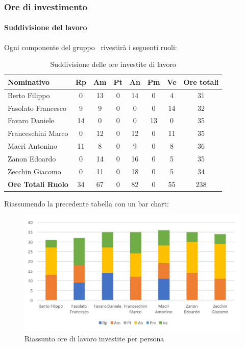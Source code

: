 \documentclass[../PianoDiProgetto.tex]{subfiles}
\begin{document}
		\newpage
		\subsubsection{Ore di investimento}
			\paragraph{Suddivisione del lavoro}
			Ogni componente del gruppo \kpanic\ rivestirà i seguenti ruoli:
			\begin{table}[h]
				\begin{tabularx}{\textwidth}{l * {6}{C} c}
				\toprule
				\textbf{Nominativo} & \textbf{Rp} & \textbf{Am} & \textbf{Pt} & \textbf{An} & \textbf{Pm} & \textbf{Ve} & \textbf{Ore totali} \\
				\midrule
				Berto Filippo &	0 & 13 & 0 & 14 & 0 & 4 &  31 \\
				Fasolato Francesco & 9 & 9 & 0 & 0 & 0 & 14 & 32 \\
				Favaro Daniele & 14 & 0 & 0 & 0 & 13 & 0 & 35 \\
				Franceschini Marco & 0 & 12 & 0 & 12 & 0 & 11 & 35 \\
				Macrì Antonino & 11 & 8 & 0 & 9 & 0 & 8 & 36 \\
				Zanon Edoardo &	0 & 14 & 0 & 16 & 0 & 5 & 35 \\
				Zecchin Giacomo & 0 & 11 & 0 & 18 & 0 & 5 & 34 \\
				\midrule			
				\textbf{Ore Totali Ruolo} & 34 & 67 & 0 & 82 & 0 & 55 & 238 \\
				\bottomrule
				\end{tabularx}
				\caption{Suddivisione delle ore investite di lavoro}		
			\end{table}

			Riassumendo la precedente tabella con un bar chart:	
			\begin{figure}[!h]
				\centering
				\includegraphics[width=\textwidth]{Preventivo//Immagini/investito_oreRuoloPersona.png}
				\caption{Riassunto ore di lavoro investite per persona}
			\end{figure}	
			
\end{document}
